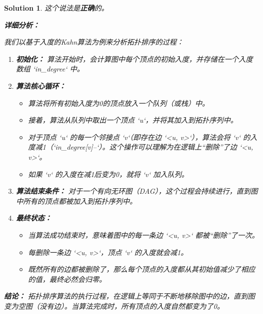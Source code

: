 \documentclass[UTF8]{report}
\newtheorem{solution}{Solution}
\theoremstyle{MyLineTheoremStyle} %
\theoremstyle{MyBlockTheoremStyle} %
\theoremstyle{MySubsubsectionStyle} %
\begin{document}
\begin{solution}
这个说法是\textbf{正确}的。

\textbf{详细分析：}

我们以基于入度的Kahn算法为例来分析拓扑排序的过程：

\begin{enumerate}
    \item \textbf{初始化：}
    算法开始时，会计算图中每个顶点的初始入度，并存储在一个入度数组 `in\_degree` 中。

    \item \textbf{算法核心循环：}
    \begin{itemize}
        \item 算法将所有初始入度为0的顶点放入一个队列（或栈）中。
        \item 接着，算法从队列中取出一个顶点 `u`，并将其加入到拓扑序列中。
        \item 对于顶点 `u` 的每一个邻接点 `v`（即存在边 `<u, v>`），算法会将 `v` 的入度减1（`in\_degree[v]--`）。这个操作可以理解为在逻辑上“删除”了边 `<u, v>`。
        \item 如果 `v` 的入度在减1后变为0，就将 `v` 加入队列。
    \end{itemize}

    \item \textbf{算法结束条件：}
    对于一个有向无环图（DAG），这个过程会持续进行，直到图中所有的顶点都被加入到拓扑序列中。

    \item \textbf{最终状态：}
    \begin{itemize}
        \item 当算法成功结束时，意味着图中的每一条边 `<u, v>` 都被“删除”了一次。
        \item 每删除一条边 `<u, v>`，顶点 `v` 的入度就会减1。
        \item 既然所有的边都被删除了，那么每个顶点的入度都从其初始值减少了相应的值，最终必然会归零。
    \end{itemize}
\end{enumerate}

\textbf{结论：}
拓扑排序算法的执行过程，在逻辑上等同于不断地移除图中的边，直到图变为空图（没有边）。当算法完成时，所有顶点的入度自然都变为了0。
\end{solution}
\end{document}

